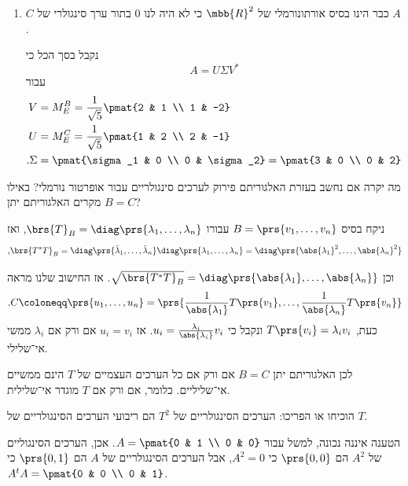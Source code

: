 \documentclass[a4paper,10pt,twoside,openany]{book}
\begin{document}
\begin{solution}
\begin{enumerate}
\item
$C$
כבר הינו בסיס אורתונורמלי של
$\mbb{R}^2$
כי לא היה לנו
$0$
בתור ערך סינגולרי של
$A$.

נקבל בסך הכל כי
\[A = U \Sigma V^*\]
עבור
\begin{align*}
V &= M^B_E = \frac{1}{\sqrt{5}} \pmat{2 & 1 \\ 1 & -2} \\
U &= M^C_E = \frac{1}{\sqrt{5}} \pmat{1 & 2 \\ 2 & -1} \\
\text{.} \Sigma &= \pmat{\sigma_1 & 0 \\ 0 & \sigma_2} = \pmat{3 & 0 \\ 0 & 2}
\end{align*}
\end{enumerate}
\end{solution}

\begin{exercisechap}
מה יקרה אם נחשב בעזרת האלגוריתם פירוק לערכים סינגולריים עבור אופרטור נורמלי?
באילו מקרים האלגוריתם יתן
$B = C$?
\end{exercisechap}

\begin{solution}
ניקח בסיס
$B = \prs{v_1, \ldots, v_n}$
עבורו
$\brs{T}_B = \diag\prs{\lambda_1, \ldots, \lambda_n}$,
ואז
\[\text{,} \brs{T^* T}_B = \diag\prs{\bar{\lambda}_1, \ldots, \bar{\lambda}_n} \diag\prs{\lambda_1, \ldots, \lambda_n} = \diag\prs{\abs{\lambda_1}^2, \ldots, \abs{\lambda_n}^2}\]
\end{solution}
וכן
$\sqrt{\brs{T^* T}_B} = \diag\prs{\abs{\lambda_1}, \ldots, \abs{\lambda_n}}$.
אז החישוב שלנו מראה
\begin{align*}
\text{.} C \coloneqq \prs{u_1, \ldots, u_n} = \prs{\frac{1}{\abs{\lambda_1}} T\prs{v_1}, \ldots, \frac{1}{\abs{\lambda_n}} T\prs{v_n}}
\end{align*}
כעת,
$T\prs{v_i} = \lambda_i v_i$
ונקבל כי
$u_i = \frac{\lambda_i}{\abs{\lambda_i}} v_i$.
אז
$u_i = v_i$
אם ורק אם
$\lambda_i$
ממשי אי־שלילי.

לכן האלגוריתם יתן
$B = C$
אם ורק אם כל הערכים העצמיים של
$T$
הינם ממשיים אי־שליליים. כלומר, אם ורק אם
$T$
מוגדר אי־שלילית.

\begin{exercisechap}
הוכיחו או הפריכו: הערכים הסינגולריים של
$T^2$
הם ריבועי הערכים הסינגולריים של
$T$.
\end{exercisechap}

\begin{solution}
הטענה איננה נכונה, למשל עבור
$A = \pmat{0 & 1 \\ 0 & 0}$.
אכן, הערכים הסינגוליים של
$A^2$
הם
$\prs{0,0}$
כי
$A^2 = 0$,
אבל הערכים הסינגולריים של
$A$
הם
$\prs{0,1}$
כי
$A^t A = \pmat{0 & 0 \\ 0 & 1}$.
\end{solution}
\end{document}
